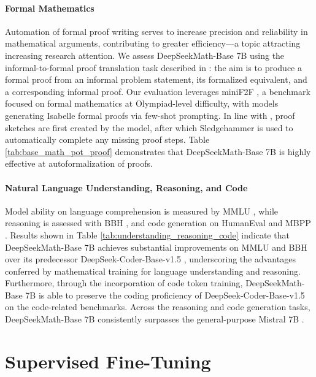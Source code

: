 \paragraph{Formal Mathematics}

Automation of formal proof writing serves to increase precision and reliability in mathematical arguments, contributing to greater efficiency—a topic attracting increasing research attention. We assess DeepSeekMath-Base 7B using the informal-to-formal proof translation task described in \citep{dsp_proof}: the aim is to produce a formal proof from an informal problem statement, its formalized equivalent, and a corresponding informal proof. Our evaluation leverages miniF2F \citep{minif2f}, a benchmark focused on formal mathematics at Olympiad-level difficulty, with models generating Isabelle formal proofs via few-shot prompting. In line with \cite{dsp_proof}, proof sketches are first created by the model, after which Sledgehammer \citep{sledgehammer} is used to automatically complete any missing proof steps. Table \ref{tab:base_math_pot_proof} demonstrates that DeepSeekMath-Base 7B is highly effective at autoformalization of proofs.

\paragraph{Natural Language Understanding, Reasoning, and Code}

Model ability on language comprehension is measured by MMLU \citep{mmlu}, while reasoning is assessed with BBH \citep{bbh}, and code generation on HumanEval \citep{codex} and MBPP \citep{mbpp}. Results shown in Table \ref{tab:understanding_reasoning_code} indicate that DeepSeekMath-Base 7B achieves substantial improvements on MMLU and BBH over its predecessor DeepSeek-Coder-Base-v1.5 \citep{deepseek-coder}, underscoring the advantages conferred by mathematical training for language understanding and reasoning. Furthermore, through the incorporation of code token training, DeepSeekMath-Base 7B is able to preserve the coding proficiency of DeepSeek-Coder-Base-v1.5 on the code-related benchmarks. Across the reasoning and code generation tasks, DeepSeekMath-Base 7B consistently surpasses the general-purpose Mistral 7B \citep{mistral}.

\section{Supervised Fine-Tuning}

